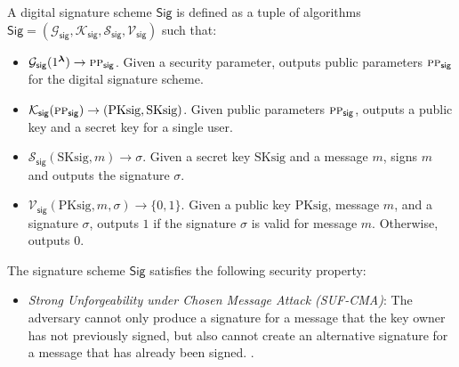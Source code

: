 \begin{definition}
	\label{def:Strongly-unforgeable digital signature}
	
	A digital signature scheme $\mathsf{Sig}$ is defined as a tuple of algorithms $\mathsf{Sig}=(\mathcal{G}_\mathsf{sig}, \mathcal{K}_\mathsf{sig}, \mathcal{S}_\mathsf{sig}, \mathcal{V}_\mathsf{sig})$ such that:
	\begin{itemize}
		\item $\mathcal{G}_\mathsf{sig}(1^{\boldsymbol{\lambda}}) \rightarrow \textsc{pp}_\mathsf{sig}$. Given a security parameter, outputs public parameters $\textsc{pp}_\mathsf{sig}$ for the digital signature scheme.
		\item $\mathcal{K}_\mathsf{sig}(\textsc{pp}_\mathsf{sig}) \rightarrow (\text{PKsig}, \text{SKsig})$. Given public parameters $\textsc{pp}_\mathsf{sig}$, outputs a public key and a secret key for a single user.
		\item $\mathcal{S}_\mathsf{sig}(\text{SKsig}, m) \rightarrow \sigma$. Given a secret key $\text{SKsig}$ and a message $m$, signs $m$ and outputs the signature $\sigma$.
		\item $\mathcal{V}_\mathsf{sig}(\text{PKsig}, m, \sigma) \rightarrow \{0, 1\}$. Given a public key $\text{PKsig}$, message $m$, and a signature $\sigma$, outputs $1$ if the signature $\sigma$ is valid for message $m$. Otherwise, outputs $0$.
	\end{itemize}
	The signature scheme $\mathsf{Sig}$ satisfies the following security property:
	\begin{itemize}
		\item \textit{Strong Unforgeability under Chosen Message Attack (SUF-CMA)}: The adversary cannot only produce a signature for a message that the key owner has not previously signed, but also cannot create an alternative signature for a message that has already been signed. \cite{Brendel2021TheProvableSecurity}.
	\end{itemize}
\end{definition}


	

